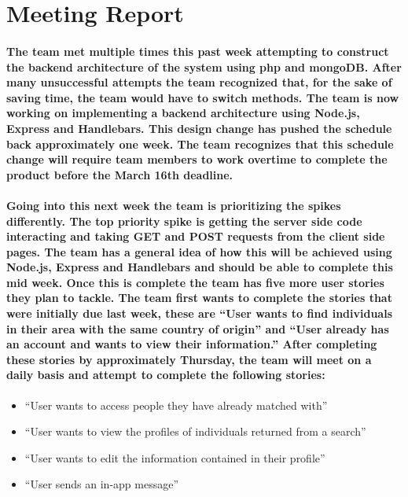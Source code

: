 \documentclass[12pt]{article}
\begin{document}
\section{\bf Meeting Report}

\paragraph{\normalfont \indent The team met multiple times this past week attempting to construct the backend architecture of the system using php and mongoDB. After many unsuccessful attempts the team recognized that, for the sake of saving time, the team would have to switch methods. The team is now working on implementing a backend architecture using Node.js, Express and Handlebars. This design change has pushed the schedule back approximately one week. The team recognizes that this schedule change will require team members to work overtime to complete the product before the March 16th deadline.
}
\paragraph{\normalfont \indent Going into this next week the team is prioritizing the spikes differently. The top priority spike is getting the server side code interacting and taking GET and POST requests from the client side pages. The team has a general idea of how this will be achieved using Node.js, Express and Handlebars and should be able to complete this mid week. Once this is complete the team has five more user stories they plan to tackle. The team first wants to complete the stories that were initially due last week, these are “User wants to find individuals in their area with the same country of origin” and “User already has an account and wants to view their information.” After completing these stories by approximately Thursday, the team will meet on a daily basis and attempt to complete the following stories:
}

  \begin{itemize}
    \item “User wants to access people they have already matched with”
    \item “User wants to view the profiles of individuals returned from a search”
    \item “User wants to edit the information contained in their profile”
    \item “User sends an in-app message”
  \end{itemize}
\end{document}
